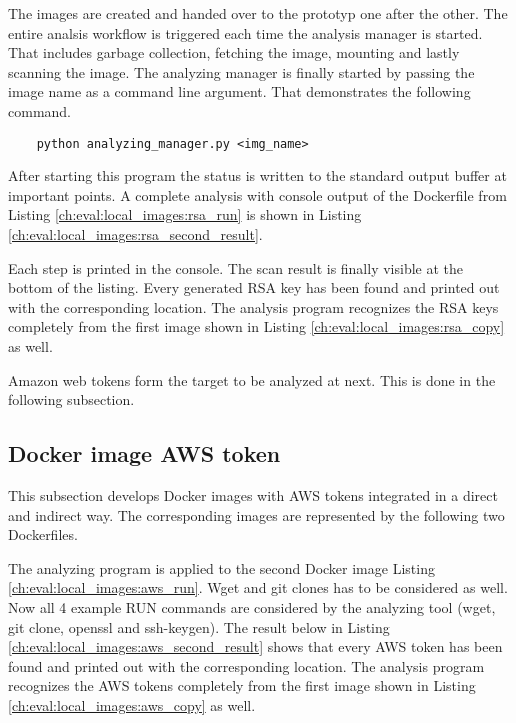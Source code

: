 The images are created and handed over to the prototyp one after the other.
The entire analsis workflow is triggered each time the analysis manager is started. 
That includes garbage collection, fetching the image, mounting and lastly scanning the image.
The analyzing manager is finally started by passing the image name as a command line argument. 
That demonstrates the following command.
\begin{lstlisting}
	python analyzing_manager.py <img_name>
\end{lstlisting}
After starting this program the status is written to the standard output buffer at important points.
A complete analysis with console output of the Dockerfile from Listing \ref{ch:eval:local_images:rsa_run} is shown in Listing \ref{ch:eval:local_images:rsa_second_result}.

Each step is printed in the console. The scan result is finally visible at the bottom of the listing. 
Every generated RSA key has been found and printed out with the corresponding location.
The analysis program recognizes the RSA keys completely from the first image shown in Listing \ref{ch:eval:local_images:rsa_copy} as well. 

Amazon web tokens form the target to be analyzed at next. This is done in the following subsection. 

\subsection{Docker image AWS token}
\label{ch:eval:local_images:aws}
This subsection develops Docker images with AWS tokens integrated in a direct and indirect way. 
The corresponding images are represented by the following two Dockerfiles.


The analyzing program is applied to the second Docker image Listing \ref{ch:eval:local_images:aws_run}. 
Wget and git clones has to be considered as well. 
Now all 4 example RUN commands are considered by the analyzing tool (wget, git clone, openssl and ssh-keygen). 
The result below in Listing \ref{ch:eval:local_images:aws_second_result} shows that every AWS token has been found and printed out with the corresponding location.
The analysis program recognizes the AWS tokens completely from the first image shown in Listing \ref{ch:eval:local_images:aws_copy} as well.


